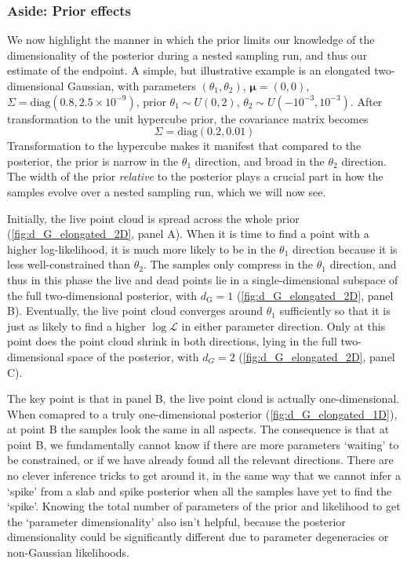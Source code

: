 \documentclass[usenatbib]{mnras}
\newcommand{\Like}{\mathcal{L}}
\newcommand{\dG}{d_\mathrm{G}}
\begin{document}
\subsubsection*{Aside: Prior effects}\label{sec:prior_effects}
We now highlight the manner in which the prior limits our knowledge of the dimensionality of the posterior during a nested sampling run, and thus our estimate of the endpoint. A simple, but illustrative example is an elongated two-dimensional Gaussian, with parameters $(\theta_1, \theta_2)$, $\bm{\mu} = (0, 0)$, $\Sigma = \mathrm{diag}(0.8, 2.5\times10^{-9})$, prior $\theta_1 \sim U(0, 2)$, $\theta_2\sim U(-10^{-3}, 10^{-3})$. After transformation to the unit hypercube prior, the covariance matrix becomes
\begin{equation}
    \Sigma = \mathrm{diag}(0.2, 0.01)
\end{equation}
Transformation to the hypercube makes it manifest that compared to the posterior, the prior is narrow in the $\theta_1$ direction, and broad in the $\theta_2$ direction. The width of the prior \textit{relative} to the posterior plays a crucial part in how the samples evolve over a nested sampling run, which we will now see.
\par
Initially, the live point cloud is spread across the whole prior (\cref{fig:d_G_elongated_2D}, panel A). When it is time to find a point with a higher log-likelihood, it is much more likely to be in the $\theta_1$ direction because it is less well-constrained than $\theta_2$. The samples only compress in the  $\theta_1$ direction, and thus in this phase the live and dead points lie in a single-dimensional subspace of the full two-dimensional posterior, with $\dG = 1$ (\cref{fig:d_G_elongated_2D}, panel B). Eventually, the live point cloud converges around $\theta_1$ sufficiently so that it is just as likely to find a higher $\log\Like$ in either parameter direction. Only at this point does the point cloud shrink in both directions, lying in the full two-dimensional space of the posterior, with $d_G = 2$ (\cref{fig:d_G_elongated_2D}, panel C). 
\par
The key point is that in panel B, the live point cloud is actually one-dimensional. When comapred to a truly one-dimensional posterior (\cref{fig:d_G_elongated_1D}), at point B the samples look the same in all aspects. The consequence is that at point B, we fundamentally cannot know if there are more parameters `waiting' to be constrained, or if we have already found all the relevant directions. There are no clever inference tricks to get around it, in the same way that we cannot infer a `spike' from a slab and spike posterior when all the samples have yet to find the `spike'. Knowing the total number of parameters of the prior and likelihood to get the `parameter dimensionality' also isn't helpful, because the posterior dimensionality could be significantly different due to parameter degeneracies or non-Gaussian likelihoods.
\end{document}
